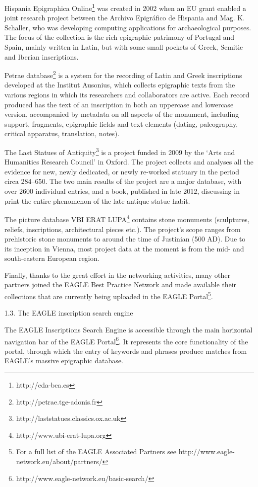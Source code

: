 \documentclass[amsthm,ebook]{saparticle}
\begin{document}
Hispania Epigraphica Online\footnote{ http://eda-bea.es} was created in 2002 when an EU grant enabled a joint research
project between the Archivo Epigráfico de Hispania and Mag. K. Schaller, who was developing computing applications for
archaeological purposes. The focus of the collection is the rich epigraphic patrimony of Portugal and Spain, mainly
written in Latin, but with some small pockets of Greek, Semitic and Iberian inscriptions.

Petrae database\footnote{ http://petrae.tge-adonis.fr} is a system for the recording of Latin and Greek inscriptions
developed at the Institut Ausonius, which collects epigraphic texts from the various regions in which its researchers
and collaborators are active. Each record produced has the text of an inscription in both an uppercase and lowercase
version, accompanied by metadata on all aspects of the monument, including support, fragments, epigraphic fields and
text elements (dating, paleography, critical apparatus, translation, notes).

The Last Statues of Antiquity\footnote{ http://laststatues.classics.ox.ac.uk } is a project funded in 2009 by the ‘Arts
and Humanities Research Council’ in Oxford. The project collects and analyses all the evidence for new, newly
dedicated, or newly re-worked statuary in the period circa 284–650. The two main results of the project are a major
database, with over 2600 individual entries, and a book, published in late 2012, discussing in print the entire
phenomenon of the late-antique statue habit.

The picture database VBI ERAT LUPA\footnote{ http://www.ubi-erat-lupa.org } contains stone monuments (sculptures,
reliefs, inscriptions, architectural pieces etc.). The project’s scope ranges from prehistoric stone monuments to
around the time of Justinian (500 AD). Due to its inception in Vienna, most project data at the moment is from the mid-
and south-eastern European region.

Finally, thanks to the great effort in the networking activities, many other partners joined the EAGLE Best Practice
Network and made available their collections that are currently being uploaded in the EAGLE Portal\footnote{ For a full
list of the EAGLE Associated Partners see http://www.eagle-network.eu/about/partners/ }. 

1.3. The EAGLE inscription search engine

The EAGLE Inscriptions Search Engine is accessible through the main horizontal navigation bar of the EAGLE
Portal\footnote{ http://www.eagle-network.eu/basic-search/ }. It represents the core functionality of the portal,
through which the entry of keywords and phrases produce matches from EAGLE’s massive epigraphic database.
\end{document}
